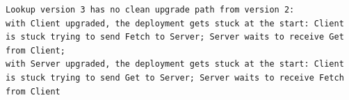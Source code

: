 \begin{lstlisting}[language={},basicstyle=\ttfamily\scriptsize,breaklines=true]
Lookup version 3 has no clean upgrade path from version 2:
with Client upgraded, the deployment gets stuck at the start: Client is stuck trying to send Fetch to Server; Server waits to receive Get from Client;
with Server upgraded, the deployment gets stuck at the start: Client is stuck trying to send Get to Server; Server waits to receive Fetch from Client
\end{lstlisting}
